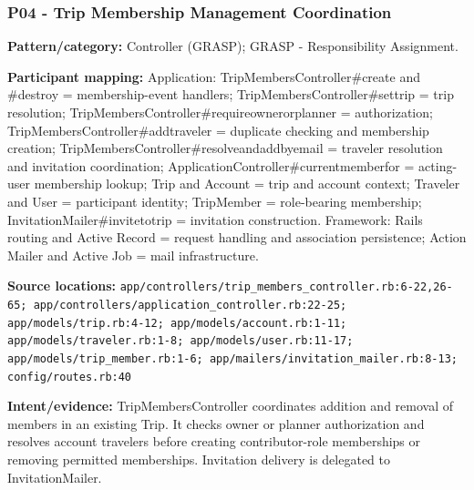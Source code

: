 \documentclass[11pt,a4paper]{article}
\renewcommand{\_}{\textunderscore\allowbreak}
\begin{document}
\subsubsection*{P04 - Trip Membership Management Coordination}
\textbf{Pattern/category:} Controller (GRASP); GRASP - Responsibility Assignment.\par
\textbf{Participant mapping:} Application: TripMembersController\#create and \#destroy = membership-event handlers; TripMembersController\#set\_trip = trip resolution; TripMembersController\#require\_owner\_or\_planner = authorization; TripMembersController\#add\_traveler = duplicate checking and membership creation; TripMembersController\#resolve\_and\_add\_by\_email = traveler resolution and invitation coordination; ApplicationController\#current\_member\_for = acting-user membership lookup; Trip and Account = trip and account context; Traveler and User = participant identity; TripMember = role-bearing membership; InvitationMailer\#invite\_to\_trip = invitation construction. Framework: Rails routing and Active Record = request handling and association persistence; Action Mailer and Active Job = mail infrastructure.\par
\textbf{Source locations:} \nolinkurl{app/controllers/trip_members_controller.rb:6-22,26-65; app/controllers/application_controller.rb:22-25; app/models/trip.rb:4-12; app/models/account.rb:1-11; app/models/traveler.rb:1-8; app/models/user.rb:11-17; app/models/trip_member.rb:1-6; app/mailers/invitation_mailer.rb:8-13; config/routes.rb:40}\par
\textbf{Intent/evidence:} TripMembersController coordinates addition and removal of members in an existing Trip. It checks owner or planner authorization and resolves account travelers before creating contributor-role memberships or removing permitted memberships. Invitation delivery is delegated to InvitationMailer.\par
\end{document}
